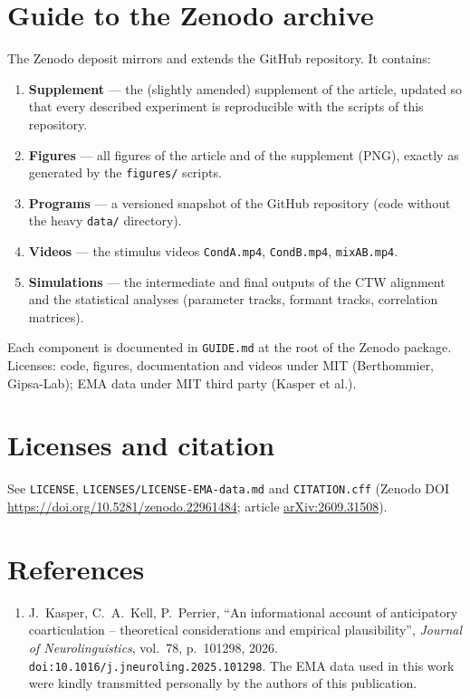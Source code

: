 \documentclass[11pt,a4paper]{article}
\begin{document}
\section{Guide to the Zenodo archive}
The Zenodo deposit mirrors and extends the GitHub repository. It contains:
\begin{enumerate}
  \item \textbf{Supplement} --- the (slightly amended) supplement of the
        article, updated so that every described experiment is reproducible
        with the scripts of this repository.
  \item \textbf{Figures} --- all figures of the article and of the supplement
        (PNG), exactly as generated by the \texttt{figures/} scripts.
  \item \textbf{Programs} --- a versioned snapshot of the GitHub repository
        (code without the heavy \texttt{data/} directory).
  \item \textbf{Videos} --- the stimulus videos \texttt{CondA.mp4},
        \texttt{CondB.mp4}, \texttt{mixAB.mp4}.
  \item \textbf{Simulations} --- the intermediate and final outputs of the
        CTW alignment and the statistical analyses (parameter tracks, formant
        tracks, correlation matrices).
\end{enumerate}
Each component is documented in \texttt{GUIDE.md} at the root of the Zenodo
package. Licenses: code, figures, documentation and videos under MIT
(Berthommier, Gipsa-Lab); EMA data under MIT third party (Kasper et al.).

\section{Licenses and citation}
See \texttt{LICENSE}, \texttt{LICENSES/LICENSE-EMA-data.md} and
\texttt{CITATION.cff} (Zenodo DOI
\url{https://doi.org/10.5281/zenodo.22961484}; article
\href{https://arxiv.org/abs/2609.31508}{arXiv:2609.31508}).

\section*{References}
\begin{enumerate}
\item J.~Kasper, C.~A.~Kell, P.~Perrier,
``An informational account of anticipatory coarticulation -- theoretical
considerations and empirical plausibility'',
\emph{Journal of Neurolinguistics}, vol.~78, p.~101298, 2026.
\texttt{doi:10.1016/j.jneuroling.2025.101298}.
The EMA data used in this work were kindly transmitted personally by the
authors of this publication.
\end{enumerate}
\end{document}
